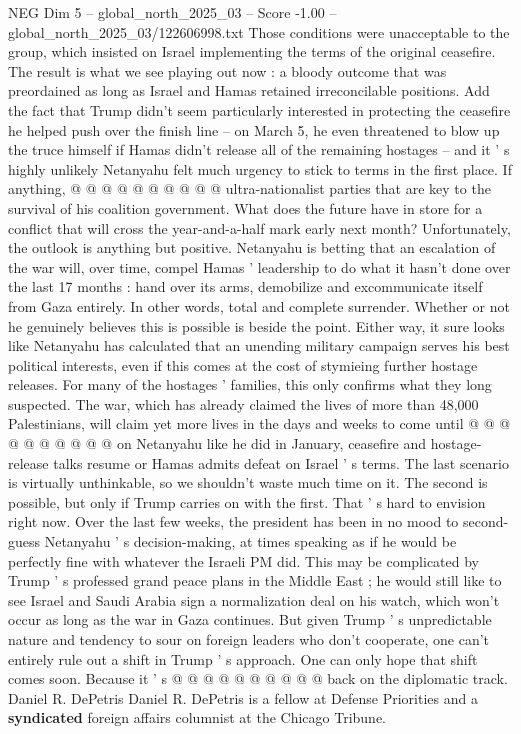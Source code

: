 \begin{textsample}{NEG Dim 5 – global\_north\_2025\_03 – Score -1.00 – global\_north\_2025\_03/122606998.txt}
Those conditions were unacceptable to the group, which insisted on Israel implementing the terms of the original ceasefire.
The result is what we see playing out now : a bloody outcome that was preordained as long as Israel and Hamas retained irreconcilable positions.
Add the fact that Trump didn't seem particularly interested in protecting the ceasefire he helped push over the finish line -- on March 5, he even threatened to blow up the truce himself if Hamas didn't release all of the remaining hostages -- and it ' s highly unlikely Netanyahu felt much urgency to stick to terms in the first place.
If anything, @ @ @ @ @ @ @ @ @ @ ultra-nationalist parties that are key to the survival of his coalition government.
What does the future have in store for a conflict that will cross the year-and-a-half mark early next month?
Unfortunately, the outlook is anything but positive.
Netanyahu is betting that an escalation of the war will, over time, compel Hamas ' leadership to do what it hasn't done over the last 17 months : hand over its arms, demobilize and excommunicate itself from Gaza entirely.
In other words, total and complete surrender.
Whether or not he genuinely believes this is possible is beside the point.
Either way, it sure looks like Netanyahu has calculated that an unending military campaign serves his best political interests, even if this comes at the cost of stymieing further hostage releases.
For many of the hostages ' families, this only confirms what they long suspected.
The war, which has already claimed the lives of more than 48,000 Palestinians, will claim yet more lives in the days and weeks to come until @ @ @ @ @ @ @ @ @ @ on Netanyahu like he did in January, ceasefire and hostage-release talks resume or Hamas admits defeat on Israel ' s terms.
The last scenario is virtually unthinkable, so we shouldn't waste much time on it.
The second is possible, but only if Trump carries on with the first.
That ' s hard to envision right now.
Over the last few weeks, the president has been in no mood to second-guess Netanyahu ' s decision-making, at times speaking as if he would be perfectly fine with whatever the Israeli PM did.
This may be complicated by Trump ' s professed grand peace plans in the Middle East ; he would still like to see Israel and Saudi Arabia sign a normalization deal on his watch, which won't occur as long as the war in Gaza continues.
But given Trump ' s unpredictable nature and tendency to sour on foreign leaders who don't cooperate, one can't entirely rule out a shift in Trump ' s approach.
One can only hope that shift comes soon.
Because it ' s @ @ @ @ @ @ @ @ @ @ back on the diplomatic track.
Daniel R.
DePetris Daniel R.
DePetris is a fellow at Defense Priorities and a \textbf{syndicated} foreign affairs columnist at the Chicago Tribune.

\end{textsample}
